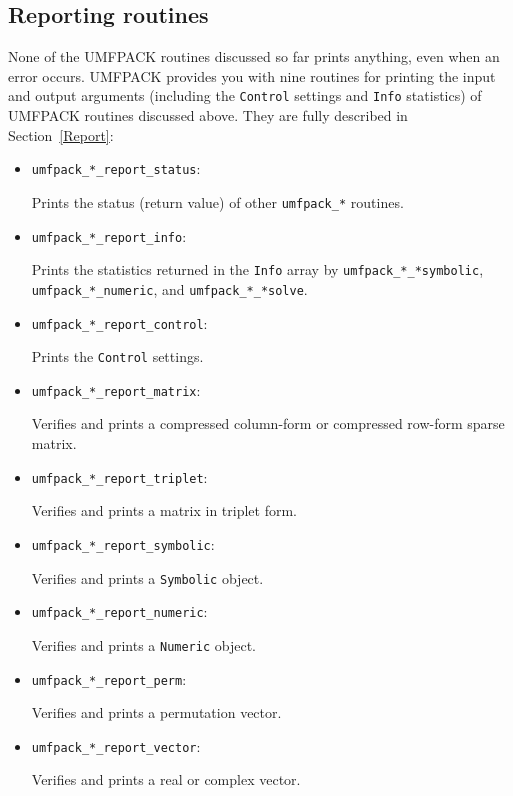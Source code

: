 \subsection{Reporting routines}

None of the UMFPACK routines discussed so far prints anything, even when an
error occurs.  UMFPACK provides you with nine routines for printing the input
and output arguments (including the {\tt Control} settings and {\tt Info}
statistics) of UMFPACK routines discussed above.  They are fully described in
Section~\ref{Report}:

\begin{itemize}
\item {\tt umfpack\_*\_report\_status}:

    Prints the status (return value) of other {\tt umfpack\_*} routines.

\item {\tt umfpack\_*\_report\_info}:

    Prints the statistics returned in the {\tt Info} array by
    {\tt umfpack\_*\_*symbolic}, \newline
    {\tt umfpack\_*\_numeric}, and {\tt umfpack\_*\_*solve}.

\item {\tt umfpack\_*\_report\_control}:

    Prints the {\tt Control} settings.

\item {\tt umfpack\_*\_report\_matrix}:

    Verifies and prints a compressed column-form or compressed row-form sparse
    matrix.

\item {\tt umfpack\_*\_report\_triplet}:

    Verifies and prints a matrix in triplet form.

\item {\tt umfpack\_*\_report\_symbolic}:

    Verifies and prints a {\tt Symbolic} object.

\item {\tt umfpack\_*\_report\_numeric}:

    Verifies and prints a {\tt Numeric} object.

\item {\tt umfpack\_*\_report\_perm}:

    Verifies and prints a permutation vector.

\item {\tt umfpack\_*\_report\_vector}:

    Verifies and prints a real or complex vector.

\end{itemize}

